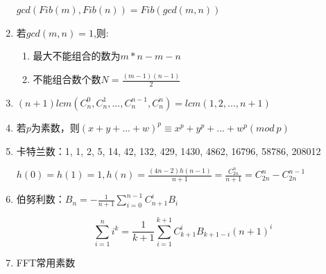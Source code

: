 \documentclass[twoside]{article}
\begin{document}
\begin{enumerate}
$gcd(Fib(m),Fib(n))=Fib(gcd(m,n))$

\item 若$gcd(m,n)=1$,则:

\begin{enumerate}
\item 最大不能组合的数为$m*n-m-n$
\item 不能组合数个数$N=\frac{(m-1)(n-1)}{2}$
\end{enumerate}

\item $(n+1)lcm(C_n^0,C_n^1,...,C_n^{n-1},C_n^{n})=lcm(1,2,...,n+1)$

\item 若$p$为素数，则$(x+y+...+w)^p\equiv x^p+y^p+...+w^p(mod\ p)$

\item 卡特兰数：1, 1, 2, 5, 14, 42, 132, 429, 1430, 4862, 16796, 58786, 208012

$h(0)=h(1)=1,h(n)=\frac{(4n-2)h(n-1)}{n+1}=\frac{C_{2n}^n}{n+1}=C_{2n}^n-C_{2n}^{n-1}$

\item 伯努利数：$B_n = -\frac{1}{n+1} \sum_{i=0}^{n-1} C_{n+1}^i B_i$

$$\sum_{i=1}^n i^k = \frac{1}{k+1} \sum_{i=1}^{k+1}C_{k+1}^i B_{k+1-i}(n+1)^i$$

\item FFT常用素数


\end{enumerate}
\end{document}
